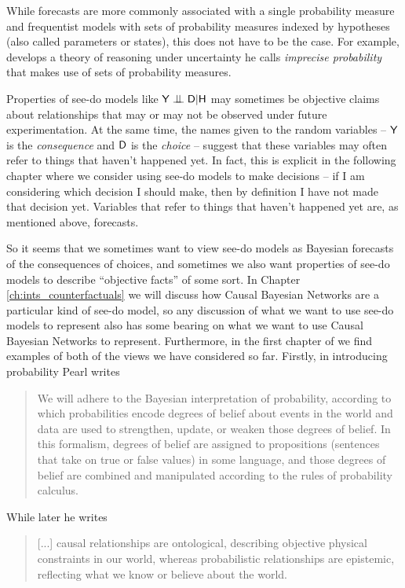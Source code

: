 While forecasts are more commonly associated with a single probability measure and frequentist models with sets of probability measures indexed by hypotheses (also called parameters or states), this does not have to be the case. For example, \citet{walley_statistical_1991} develops a theory of reasoning under uncertainty he calls \emph{imprecise probability} that makes use of sets of probability measures.

Properties of see-do models like $\RV{Y}\CI\RV{D}|\RV{H}$ may sometimes be objective claims about relationships that may or may not be observed under future experimentation. At the same time, the names given to the random variables -- $\mathsf{Y}$ is the \emph{consequence} and $\mathsf{D}$ is the \emph{choice} -- suggest that these variables may often refer to things that haven't happened yet. In fact, this is explicit in the following chapter where we consider using see-do models to make decisions -- if I am considering which decision I should make, then by definition I have not made that decision yet. Variables that refer to things that haven't happened yet are, as mentioned above, forecasts.

So it seems that we sometimes want to view see-do models as Bayesian forecasts of the consequences of choices, and sometimes we also want properties of see-do models to describe ``objective facts'' of some sort. In Chapter \ref{ch:ints_counterfactuals} we will discuss how Causal Bayesian Networks are a particular kind of see-do model, so any discussion of what we want to use see-do models to represent also has some bearing on what we want to use Causal Bayesian Networks to represent. Furthermore, in the first chapter of \citet{pearl_causality:_2009} we find examples of both of the views we have considered so far. Firstly, in introducing probability Pearl writes

\begin{quote}
We will adhere to the Bayesian interpretation of probability, according to which probabilities encode degrees of belief about events in the world and data are used to strengthen, update, or weaken those degrees of belief. In this formalism, degrees of belief are assigned to propositions (sentences that take on true or false values) in some language, and those degrees of belief are combined and manipulated according to the rules of probability calculus.
\end{quote}

While later he writes

\begin{quote}
[...] causal relationships are ontological, describing objective physical constraints in our world, whereas probabilistic relationships are epistemic, reflecting what we know or believe about the world.
\end{quote}

